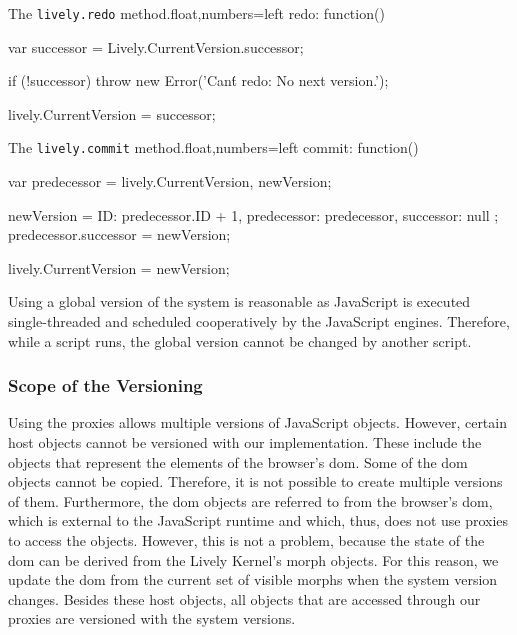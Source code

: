 \begin{code}{The \lstinline{lively.redo} method.}{float,numbers=left}
redo: function() {
    var successor = Lively.CurrentVersion.successor;
    
    if (!successor) {
        throw new Error('Can\'t redo: No next version.');
    }
    
    lively.CurrentVersion = successor;
}
\end{code}
\iffalse
\end{verbatim}\fi

\begin{code}{The \lstinline{lively.commit} method.}{float,numbers=left}
commit: function() {
    var predecessor = lively.CurrentVersion,
        newVersion;
    
    newVersion = {
        ID: predecessor.ID + 1,
        predecessor: predecessor,
        successor: null
    };
    predecessor.successor = newVersion;
    
    lively.CurrentVersion = newVersion;
}
\end{code}
\iffalse
\end{verbatim}\fi

Using a global version of the system is reasonable as JavaScript is executed single-threaded and scheduled cooperatively by the JavaScript engines.
Therefore, while a script runs, the global version cannot be changed by another script.

 
\subsubsection{Scope of the Versioning} \label{subsubsec:IMPLEMENTATION:5.2.1}

Using the proxies allows multiple versions of JavaScript objects.
However, certain host objects cannot be versioned with our implementation.
These include the objects that represent the elements of the browser's \ac{dom}.
Some of the \ac{dom} objects cannot be copied.
Therefore, it is not possible to create multiple versions of them.
Furthermore, the \ac{dom} objects are referred to from the browser's \ac{dom}, which is external to the JavaScript runtime and which, thus, does not use proxies to access the objects.
However, this is not a problem, because the state of the \ac{dom} can be derived from the Lively Kernel's morph objects.
For this reason, we update the \ac{dom} from the current set of visible morphs when the system version changes.
Besides these host objects, all objects that are accessed through our proxies are versioned with the system versions.





